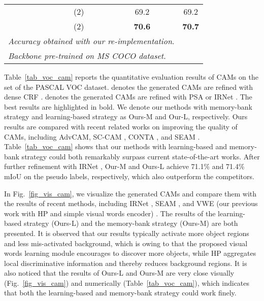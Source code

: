 \begin{table}[!tp]
\begin{tabular}{l|c|c|cc}
                                                       &                                   & (2)                           & 69.2          & 69.2\tablefootnote{\url{http://host.robots.ox.ac.uk:8080/anonymous/Y0XECB.html}}          \\
    \rowcolor[HTML]{eaeaea}
    \multirow{-2}{*}{Ours-L}                           &                                   & (2)                 & \textbf{70.6} & \textbf{70.7}\tablefootnote{\url{http://host.robots.ox.ac.uk:8080/anonymous/0QVYDO.html}} \\
    \bottomrule
    \multicolumn{4}{l}{\textit{ Accuracy obtained with our re-implementation}.}                                                                                                                                                    \\
    \multicolumn{4}{l}{\textit{ Backbone pre-trained on MS COCO dataset}.}
  \end{tabular}

\end{table}
\par Table~\ref{tab_voc_cam} reports the quantitative evaluation results of CAMs on the  set of the PASCAL VOC dataset.  denotes the generated CAMs are refined with dense CRF \citep{krahenbuhl2011efficient}.  denotes the generated CAMs are refined with PSA \citep{ahn2018learning} or IRNet \citep{ahn2019weakly}. The best results are highlighted in bold. We denote our methods with memory-bank strategy and learning-based strategy as Ours-M and Our-L, respectively. Ours results are compared with recent related works on improving the quality of CAMs, including AdvCAM\citep{lee2021anti}, SC-CAM \citep{chang2020weakly}, CONTA \citep{zhang2020causal}, and SEAM \citep{wang2020self} \etc. Table~\ref{tab_voc_cam} shows that our methods with learning-based and memory-bank strategy could both remarkably surpass current state-of-the-art works. After further refinement with IRNet \citep{ahn2019weakly}, Our-M and Ours-L achieve 71.1\% and 71.4\% mIoU on the pseudo labels, respectively, which also outperform the competitors.

\par In Fig.~\ref{fig_vis_cam}, we visualize the generated CAMs and compare them with the results of recent methods, including IRNet \citep{ahn2019weakly}, SEAM \citep{wang2020self}, and VWE (our previous work with HP and simple visual words encoder) \citep{ru2021learning}. The results of the learning-based strategy (Ours-L) and the memory-bank strategy (Ours-M) are both presented. It is observed that our results typically activate more object regions and less mis-activated background, which is owing to that the proposed visual words learning module encourages to discover more objects, while HP aggregates local discriminative information and thereby reduces background regions. It is also noticed that the results of Ours-L and Ours-M are very close visually (Fig.~\ref{fig_vis_cam}) and numerically (Table~\ref{tab_voc_cam}), which indicates that both the learning-based and memory-bank strategy could work finely.


